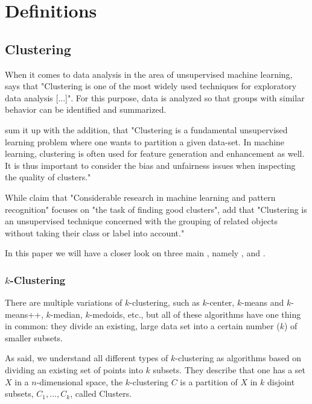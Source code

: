 \section{Definitions}


\subsection{Clustering}

When it comes to data analysis in the area of unsupervised machine learning, \textcite[1]{VonLuxburg2007} says that "Clustering is one of the most widely used techniques for exploratory data analysis [...]". For this purpose, data is analyzed so that groups with similar behavior can be identified and summarized.

\textcite[]{Bera2019} sum it up with the addition, that "Clustering is a fundamental unsupervised learning problem where one wants to partition a given data-set. In machine learning, clustering is often used for feature generation and enhancement as well. It is thus important to consider the bias and unfairness issues when inspecting the quality of clusters." \autocite[1]{Bera2019}

While \textcite[1]{Ng2001} claim that "Considerable research in machine learning and pattern recognition" focuses on "the task of finding good clusters", \textcite[1]{Nascimento2011} add that "Clustering is an unsupervised technique concerned with the grouping of related objects without taking their class or label into account."

In this paper we will have a closer look on three main , namely ,  and .

\subsubsection{$k$-Clustering}

There are multiple variations of $k$-clustering, such as $k$-center, $k$-means and $k$-means++, $k$-median, $k$-medoids, etc., but all of these algorithms have one thing in common: they divide an existing, large data set into a certain number ($k$) of smaller subsets.

As  \textcite[]{Chierichetti2018} said, we understand all different types of $k$-clustering as algorithms based on dividing an existing set of points into $k$ subsets. They describe that one has a set $X$ in a $n$-dimensional space, the $k$-clustering $C$ is a partition of $X$ in $k$ disjoint subsets, $C_{1},...,C_{k}$, called Clusters. \autocite[3]{Chierichetti2018}


